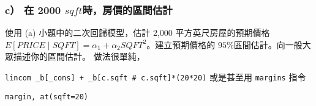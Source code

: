 \begin{frame}
    \frametitle{ c） 在 2000 $sqft$時，房價的區間估計}
    使用 (a) 小題中的二次回歸模型，估計 2,000 平方英尺房屋的預期價格$E[PRICE \mid SQFT] = \alpha_1 + \alpha_2 SQFT^2$。建立預期價格的 $95\%$區間估計。向一般大眾描述你的區間估計。
    \vfill
    做法很單純，

    \texttt{lincom \_b[\_cons] + \_b[c.sqft \# c.sqft]*(20*20)}
    \vfill
    或是甚至用 \texttt{margins} 指令

    \texttt{margin, at(sqft=20)}
\end{frame}